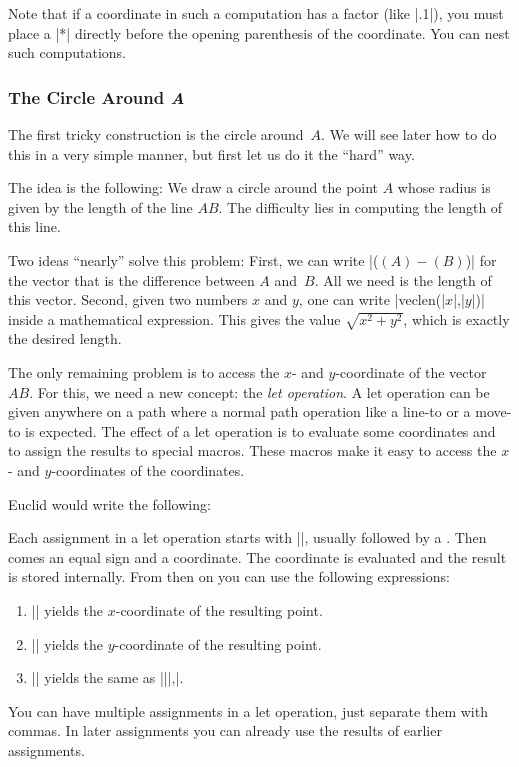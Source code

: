 Note that if a coordinate in such a computation has a factor (like |.1|), you
must place a |*| directly before the opening parenthesis of the coordinate. You
can nest such computations.


\subsubsection{The Circle Around \emph{A}}

The first tricky construction is the circle around~$A$. We will see later how
to do this in a very simple manner, but first let us do it the ``hard'' way.

The idea is the following: We draw a circle around the point $A$ whose radius
is given by the length of the line $AB$. The difficulty lies in computing the
length of this line.

Two ideas ``nearly'' solve this problem: First, we can write |($ (A) - (B) $)|
for the vector that is the difference between $A$ and~$B$. All we need is the
length of this vector. Second, given two numbers $x$ and $y$, one can write
|veclen(|$x$|,|$y$|)| inside a mathematical expression. This gives the value
$\sqrt{x^2+y^2}$, which is exactly the desired length.

The only remaining problem is to access the $x$- and $y$-coordinate of the
vector~$AB$. For this, we need a new concept: the \emph{let operation}. A let
operation can be given anywhere on a path where a normal path operation like a
line-to or a move-to is expected. The effect of a let operation is to evaluate
some coordinates and to assign the results to special macros. These macros make
it easy to access the $x$- and $y$-coordinates of the coordinates.

Euclid would write the following:
%
\begin{codeexample}[preamble={\usetikzlibrary{calc}}]
\end{codeexample}

Each assignment in a let operation starts with |\p|, usually followed by a
. Then comes an equal sign and a coordinate. The coordinate is
evaluated and the result is stored internally. From then on you can use the
following expressions:
%
\begin{enumerate}
    \item |\x| yields the $x$-coordinate of the resulting point.
    \item |\y| yields the $y$-coordinate of the resulting point.
    \item |\p| yields the same as
        |\x||,\y|.
\end{enumerate}
%
You can have multiple assignments in a let operation, just separate them with
commas. In later assignments you can already use the results of earlier
assignments.

